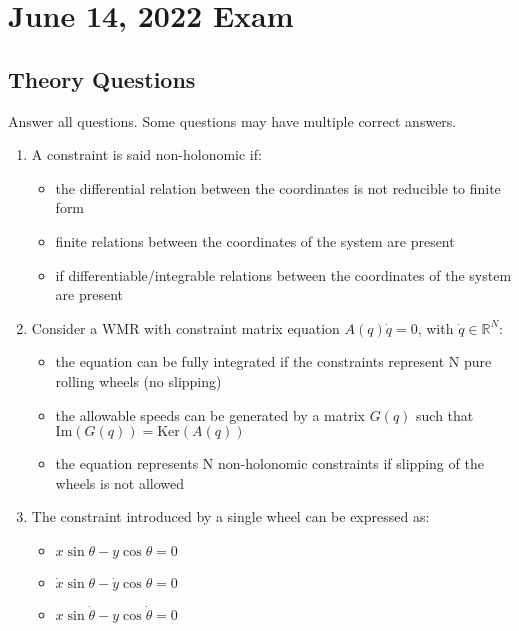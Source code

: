 \documentclass[openany]{book}
\newcommand{\R}{\mathbb{R}}
\theoremstyle{definition}
\theoremstyle{remark}
\begin{document}
\chapter{June 14, 2022 Exam}

\section*{Theory Questions}
Answer all questions. Some questions may have multiple correct answers.

\begin{enumerate}
    \item A constraint is said non-holonomic if:
    \begin{itemize}
        \item[\checkmark] the differential relation between the coordinates is not reducible to finite form
        \item[] finite relations between the coordinates of the system are present
        \item[] if differentiable/integrable relations between the coordinates of the system are present
    \end{itemize}

    \item Consider a WMR with constraint matrix equation $A(q)\dot{q} = 0$, with $\dot{q} \in \R^N$:
    \begin{itemize}
        \item[] the equation can be fully integrated if the constraints represent N pure rolling wheels (no slipping)
        \item[\checkmark] the allowable speeds can be generated by a matrix $G(q)$ such that $\text{Im}(G(q)) = \text{Ker}(A(q))$
        \item[] the equation represents N non-holonomic constraints if slipping of the wheels is not allowed
    \end{itemize}

    \item The constraint introduced by a single wheel can be expressed as:
    \begin{itemize}
        \item[] $x\sin\theta - y\cos\theta = 0$
        \item[\checkmark] $\dot{x}\sin\theta - \dot{y}\cos\theta = 0$
        \item[] $x\sin\dot{\theta} - y\cos\dot{\theta} = 0$
    \end{itemize}


\end{enumerate}
\end{document}
